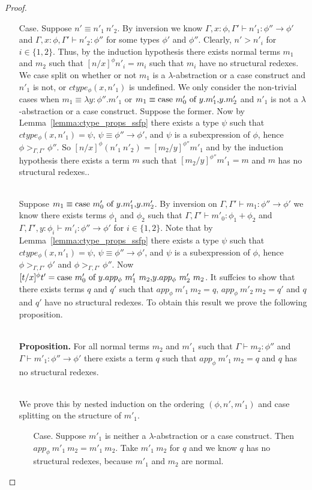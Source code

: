 \begin{proof}
\begin{itemize}
\item[Case.] Suppose $n' \equiv n'_1\ n'_2$.  By inversion we know
  $\Gamma, x:\phi, \Gamma' \vdash n'_1 : \phi'' \to \phi'$ and
  $\Gamma, x:\phi, \Gamma' \vdash n'_2 : \phi''$ for some types $\phi'$ and $\phi''$.
  Clearly, $n' > n'_i$ for $i \in \{1,2\}$.  Thus, by the induction hypothesis
  there exists normal terms $m_1$ and $m_2$ such that $[n/x]^\phi n'_i = m_i$ such that $m_i$ have no
  structural redexes.  We case split on whether or not $m_1$ is a $\lambda$-abstraction
  or a case construct and $n'_1$ is not, or $ctype_\phi(x,n'_1)$ is undefined.  
  We only consider the non-trivial cases when 
  $m_1 \equiv \lambda y:\phi''.m'_1$ or $m_1 \equiv \mbox{case}\ m'_0\ \text{of}\ y\text{.}m'_1\text{,}y\text{.}m'_2$ and $n'_1$
  is not a $\lambda$-abstraction or a case construct.
  Suppose the former.  
  Now by Lemma~\ref{lemma:ctype_props_ssfp} there exists a type $\psi$ such that 
  $ctype_\phi(x, n'_1) = \psi$, $\psi \equiv \phi'' \to \phi'$, and $\psi$ is a subexpression
  of $\phi$, hence $\phi >_{\Gamma,\Gamma'} \phi''$. So $[n/x]^\phi (n'_1\ n'_2) = [m_2/y]^{\phi''} m'_1$ and
  by the induction hypothesis there exists a term $m$ such that 
  $[m_2/y]^{\phi''} m'_1 = m$ and $m$ has no structural redexes..  
  
  \ \\
  Suppose $m_1 \equiv \mbox{case}\ m'_0\ \text{of}\ y\text{.}m'_1\text{,}y\text{.}m'_2$.
  By inversion on
  $\Gamma,\Gamma' \vdash m_1 : \phi'' \to \phi'$ we know there exists terms $\phi_1$ and $\phi_2$ such that
  $\Gamma,\Gamma' \vdash m'_0:\phi_1+\phi_2$ and
  $\Gamma,\Gamma',y:\phi_i \vdash m'_i:\phi'' \to \phi'$
  for $i \in \{1,2\}$.  Note that by Lemma~\ref{lemma:ctype_props_ssfp} there exists a type $\psi$ such that 
  $ctype_\phi(x, n'_1) = \psi$, $\psi \equiv \phi'' \to \phi'$, and $\psi$ is a subexpression
  of $\phi$, hence $\phi >_{\Gamma,\Gamma'} \phi'$ and $\phi >_{\Gamma,\Gamma'} \phi''$.  
  Now $[t/x]^\phi t' = \ccon{m'_0}{y}{app_\phi\ m'_1\ m_2}{app_\phi\ m'_2\ m_2}$.  It suffcies to show that
  there exists terms $q$ and $q'$ such that $app_\phi\ m'_1\ m_2 = q$, $app_\phi\ m'_2\ m_2 = q'$ and $q$ and $q'$ have
  no structural redexes.  To obtain this result we prove the following proposition.
  
  \ \\
  {\bf Proposition.}  For all normal terms $m_2$ and $m'_1$ such that  
  $\Gamma \vdash m_2 : \phi''$ and $\Gamma \vdash m'_1:\phi'' \to \phi'$
  there exists a term $q$ such that $app_\phi\ m'_1\ m_2 = q$ and $q$ has no structural redexes.
  
  \ \\
  We prove this by nested induction on the ordering $(\phi, n', m'_1)$ and case splitting on 
  the structure of $m'_1$.
  \begin{itemize}
  \item[Case.] Suppose $m'_1$ is neither a $\lambda$-abstraction or a case construct.  Then
    $app_\phi\  m'_1\ m_2 = m'_1\ m_2$.  Take $m'_1\ m_2$ for $q$ and we know $q$ has no structural
    redexes, because $m'_1$ and $m_2$ are normal.
    

\end{itemize}
\end{itemize}
\end{proof}
